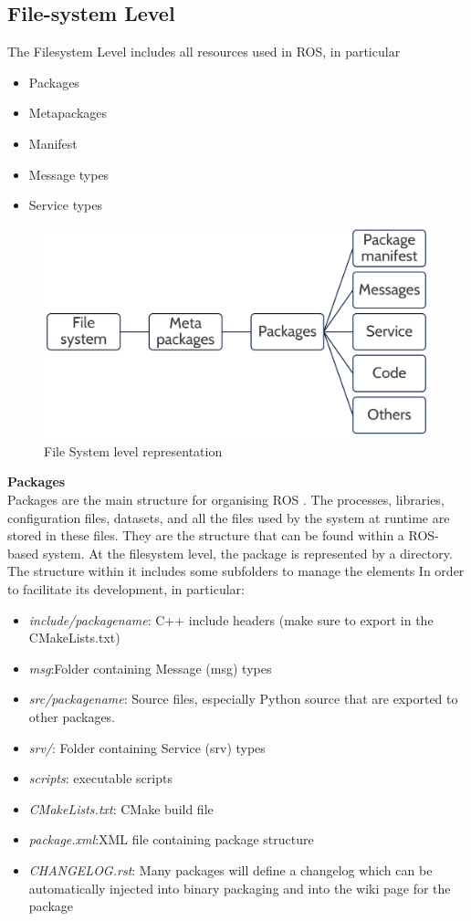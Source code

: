 \subsection{File-system Level}
The Filesystem Level includes all resources used in ROS, in particular
\begin{itemize}
    \item Packages
    \item Metapackages
    \item Manifest
    \item Message types
    \item Service types
\end{itemize}
\begin{figure}
    \centering
    \includegraphics[scale=0.5]{Images/Chapter 2/Filesystem.png}
    \caption{File System level representation}
    \label{fig:Filesystem}
\end{figure}
\textbf{Packages}\\
Packages are the main structure for organising ROS  \citet{rospackages}. The processes, libraries, configuration files, datasets, and all the files used by the system at runtime are stored in these files. They are the structure that can be found within a ROS-based system. At the filesystem level, the package is represented by a directory. The structure within it includes some subfolders to manage the elements
In order to facilitate its development, in particular:
\begin{itemize}
    \item \textit{include/packagename}: C++ include headers (make sure to export in the CMakeLists.txt)
    \item \textit{msg}:Folder containing Message (msg) types
    \item \textit{src/packagename}: Source files, especially Python source that are exported to other packages.
    \item \textit{srv/}: Folder containing Service (srv) types
    \item \textit{scripts}: executable scripts
    \item \textit{CMakeLists.txt}: CMake build file
    \item \textit{package.xml}:XML file containing package structure 
    \item \textit{CHANGELOG.rst}: Many packages will define a changelog which can be automatically injected into binary packaging and into the wiki page for the package
\end{itemize}\\
